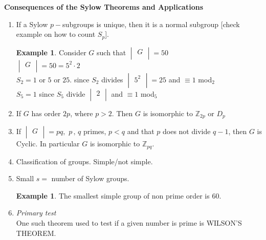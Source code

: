 \documentclass[11pt,a4paper]{article}
\theoremstyle{definition}
\newtheorem{exa}[thm]{Example}
\begin{document}
\textbf{Consequences of the Sylow Theorems  and Applications}
\begin{enumerate}
\item[•] If a Sylow $p-$subgroups is unique, then it is a normal subgroup [check example on how to count $S_p$].\\

\begin{exa}
Consider $G$ such that $\begin{vmatrix}
G\\
\end{vmatrix} = 50$\\
$\begin{vmatrix}
G\\
\end{vmatrix} = 50 = 5^2\cdot 2$\\
$S_2 = 1$ or $5$ or $25$. since $S_2$ divides $\begin{vmatrix}
5^2\\
\end{vmatrix} = 25$ and $\equiv 1$ mod$_2$\\
$S_5 = 1$ since $S_5$ divide $\begin{vmatrix}
2\\
\end{vmatrix}$ and $\equiv 1$ mod$_5$\\
\end{exa}

\item[•] If $G$ has order $2p$, where $p>2$. Then $G$ is isomorphic to $\mathbb{Z}_{2p}$ or $D_p$
\item[•] If $\begin{vmatrix}
G\\
\end{vmatrix} = pq,\, \, p\, , \, q$ primes, $p<q$ and that $p$ does not divide $q-1$, then $G$ is Cyclic. In particular $G$ is isomorphic to $\mathbb{Z}_{pq}$.
\item[•] Classification of groups. Simple/not simple.
\item[•] Small $s = $ number of Sylow groups.\\

\begin{exa}
The smallest simple group of non prime order is 60.\\
\end{exa}

\item[•] \textit{Primary test}\\
One such theorem used to test if a given number is prime is WILSON'S THEOREM.\\\\\\
\end{enumerate}
\end{document}
